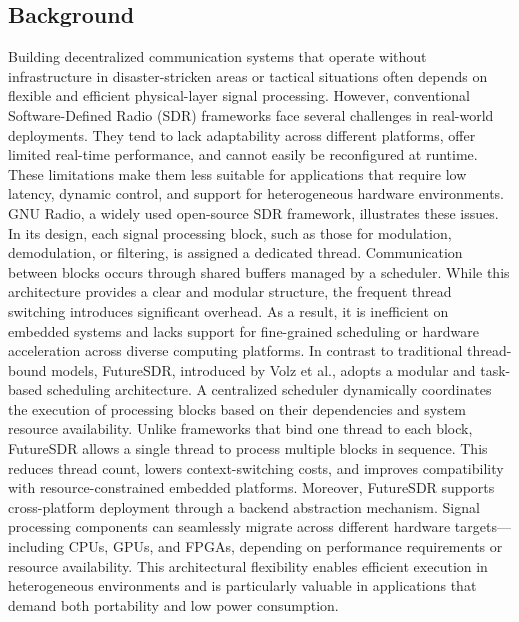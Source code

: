 \subsection{Background}
Building decentralized communication systems that operate without infrastructure in disaster-stricken areas or tactical situations often depends on flexible and efficient physical-layer signal processing. However, conventional Software-Defined Radio (SDR) frameworks face several challenges in real-world deployments. They tend to lack adaptability across different platforms, offer limited real-time performance, and cannot easily be reconfigured at runtime. These limitations make them less suitable for applications that require low latency, dynamic control, and support for heterogeneous hardware environments.
GNU Radio, a widely used open-source SDR framework, illustrates these issues. In its design, each signal processing block, such as those for modulation, demodulation, or filtering, is assigned a dedicated thread. Communication between blocks occurs through shared buffers managed by a scheduler. While this architecture provides a clear and modular structure, the frequent thread switching introduces significant overhead. As a result, it is inefficient on embedded systems and lacks support for fine-grained scheduling or hardware acceleration across diverse computing platforms.
In contrast to traditional thread-bound models, FutureSDR, introduced by Volz et al., adopts a modular and task-based scheduling architecture. A centralized scheduler dynamically coordinates the execution of processing blocks based on their dependencies and system resource availability. Unlike frameworks that bind one thread to each block, FutureSDR allows a single thread to process multiple blocks in sequence. This reduces thread count, lowers context-switching costs, and improves compatibility with resource-constrained embedded platforms.
Moreover, FutureSDR supports cross-platform deployment through a backend abstraction mechanism. Signal processing components can seamlessly migrate across different hardware targets—including CPUs, GPUs, and FPGAs, depending on performance requirements or resource availability. This architectural flexibility enables efficient execution in heterogeneous environments and is particularly valuable in applications that demand both portability and low power consumption.

